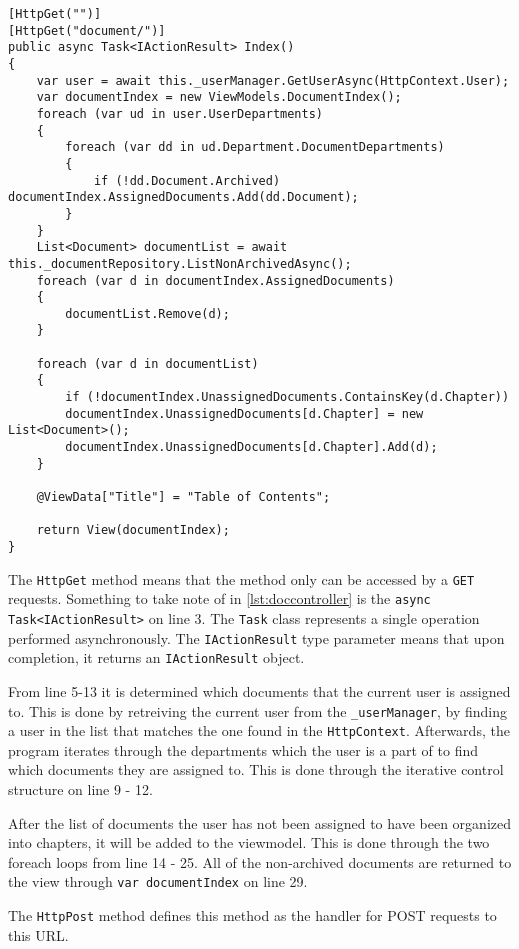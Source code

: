 \begin{lstlisting}[caption={Document Controller: Index}, label={lst:doccontroller}]
[HttpGet("")]
[HttpGet("document/")]
public async Task<IActionResult> Index()
{
	var user = await this._userManager.GetUserAsync(HttpContext.User);
	var documentIndex = new ViewModels.DocumentIndex();
	foreach (var ud in user.UserDepartments)
	{
		foreach (var dd in ud.Department.DocumentDepartments)
		{
			if (!dd.Document.Archived) documentIndex.AssignedDocuments.Add(dd.Document);
		}
	}
	List<Document> documentList = await this._documentRepository.ListNonArchivedAsync();
	foreach (var d in documentIndex.AssignedDocuments)
	{
		documentList.Remove(d);
	}

	foreach (var d in documentList)
	{
		if (!documentIndex.UnassignedDocuments.ContainsKey(d.Chapter))
		documentIndex.UnassignedDocuments[d.Chapter] = new List<Document>();
		documentIndex.UnassignedDocuments[d.Chapter].Add(d);
	}

	@ViewData["Title"] = "Table of Contents";

	return View(documentIndex);
}
\end{lstlisting}

The \texttt{HttpGet} method means that the method only can be accessed by a \texttt{GET} requests.
Something to take note of in \cref{lst:doccontroller} is the \texttt{async Task<IActionResult>} on line 3.
The \texttt{Task} class represents a single operation \cite{microsoft} performed asynchronously.
The \texttt{IActionResult} type parameter means that upon completion, it returns an \texttt{IActionResult} object.

From line 5-13 it is determined which documents that the current user is assigned to.
This is done by retreiving the current user from the \texttt{_userManager}, by finding a user in the list that matches the one found in the \texttt{HttpContext}.
Afterwards, the program iterates through the departments which the user is a part of to find which documents they are assigned to.
This is done through the iterative control structure on line 9 - 12.

After the list of documents the user has not been assigned to have been organized into chapters, it will be added to the viewmodel.
This is done through the two foreach loops from line 14 - 25.
All of the non-archived documents are returned to the view through \texttt{var documentIndex} on line 29.

The \texttt{HttpPost} method defines this method as the handler for POST requests to this URL.

